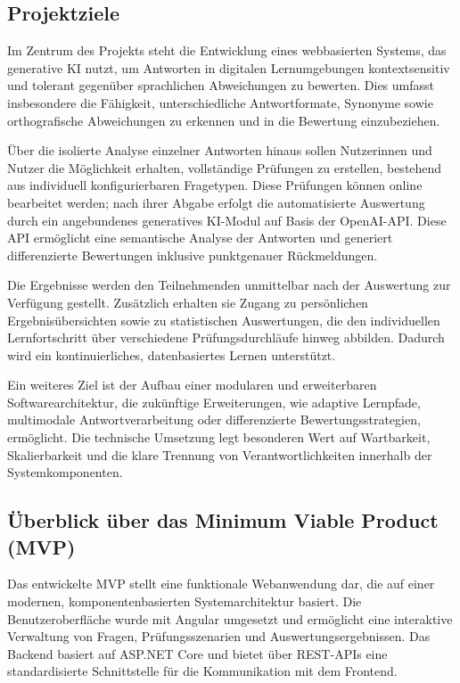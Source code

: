 \documentclass[a4paper,12pt]{article}
\begin{document}
\subsection{Projektziele}
Im Zentrum des Projekts steht die Entwicklung eines webbasierten Systems, das generative KI nutzt, um Antworten in digitalen Lernumgebungen kontextsensitiv und tolerant gegenüber sprachlichen Abweichungen zu bewerten. Dies umfasst insbesondere die Fähigkeit, unterschiedliche Antwortformate, Synonyme sowie orthografische Abweichungen zu erkennen und in die Bewertung einzubeziehen.

Über die isolierte Analyse einzelner Antworten hinaus sollen Nutzerinnen und Nutzer die Möglichkeit erhalten, vollständige Prüfungen zu erstellen, bestehend aus individuell konfigurierbaren Fragetypen. Diese Prüfungen können online bearbeitet werden; nach ihrer Abgabe erfolgt die automatisierte Auswertung durch ein angebundenes generatives KI-Modul auf Basis der OpenAI-API. Diese API ermöglicht eine semantische Analyse der Antworten und generiert differenzierte Bewertungen inklusive punktgenauer Rückmeldungen.

Die Ergebnisse werden den Teilnehmenden unmittelbar nach der Auswertung zur Verfügung gestellt. Zusätzlich erhalten sie Zugang zu persönlichen Ergebnisübersichten sowie zu statistischen Auswertungen, die den individuellen Lernfortschritt über verschiedene Prüfungsdurchläufe hinweg abbilden. Dadurch wird ein kontinuierliches, datenbasiertes Lernen unterstützt.

Ein weiteres Ziel ist der Aufbau einer modularen und erweiterbaren Softwarearchitektur, die zukünftige Erweiterungen, wie adaptive Lernpfade, multimodale Antwortverarbeitung oder differenzierte Bewertungsstrategien, ermöglicht. Die technische Umsetzung legt besonderen Wert auf Wartbarkeit, Skalierbarkeit und die klare Trennung von Verantwortlichkeiten innerhalb der Systemkomponenten.

\subsection{Überblick über das Minimum Viable Product (MVP)}
Das entwickelte MVP stellt eine funktionale Webanwendung dar, die auf einer modernen, komponentenbasierten Systemarchitektur basiert. Die Benutzeroberfläche wurde mit Angular umgesetzt und ermöglicht eine interaktive Verwaltung von Fragen, Prüfungsszenarien und Auswertungsergebnissen. Das Backend basiert auf ASP.NET Core und bietet über REST-APIs eine standardisierte Schnittstelle für die Kommunikation mit dem Frontend.
\end{document}
